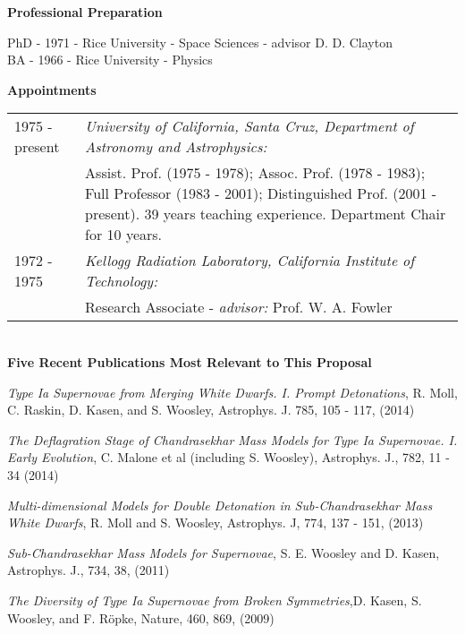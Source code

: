 \documentclass[12pt,letterpaper,english]{article}
\begin{document}
\begin{flushleft} {\bf Professional Preparation}
{\parindent 16pt

PhD - 1971 - Rice University - Space Sciences - advisor D. D. Clayton \\  
BA  - 1966 - Rice University - Physics \\ 

}

\vspace{.04in}
{\bf Appointments}
\begin{tabular*}{\textwidth}{p{1.0 in}p{5.3 in}}
\\[-3 mm]
1975 - present              & {\it University of California, Santa Cruz, 
                            Department of Astronomy and Astrophysics:} \\
                            & Assist. Prof. (1975 - 1978); Assoc. Prof. (1978 - 1983); 
                              Full Professor (1983 - 2001); Distinguished Prof. 
                              (2001 - present). 39 years teaching experience. 
                              Department Chair for 10 years.

\\[-3mm]
1972 - 1975             & {\it Kellogg Radiation Laboratory, California Institute 
                              of Technology:} \\
                        & Research Associate - {\it advisor: } Prof. W. A. Fowler\\

\end{tabular*}\\



\vspace{.04in}
{\bf Five Recent Publications Most Relevant to This Proposal}
\vspace{-6pt}
\begin{enumerate*} 
\item {\it Type Ia Supernovae from Merging White Dwarfs. I. Prompt
  Detonations}, R. Moll, C. Raskin, D. Kasen, and S.  Woosley,
  Astrophys. J. 785, 105 - 117, (2014) \\
\item {\it The Deflagration Stage of Chandrasekhar Mass Models for
  Type Ia Supernovae. I. Early Evolution}, C. Malone et al (including
  S. Woosley), Astrophys. J., 782, 11 - 34 (2014)\\
\item {\it Multi-dimensional Models for Double Detonation in
  Sub-Chandrasekhar Mass White Dwarfs}, R. Moll and S. Woosley,
  Astrophys. J, 774, 137 - 151, (2013)\\
\item {\it Sub-Chandrasekhar Mass Models for Supernovae}, 
    S. E. Woosley and D. Kasen, Astrophys. J., 734, 38, (2011) \\ 
\item {\it The Diversity of Type Ia Supernovae from Broken
  Symmetries},D. Kasen, S. Woosley, and F. R\"opke, Nature, 460, 869, 
  (2009) \\ 
\end{enumerate*} 


\end{flushleft}
\end{document}
